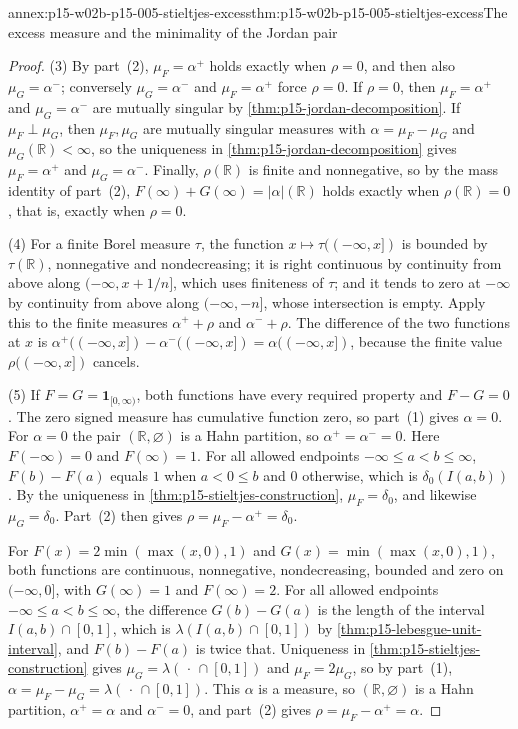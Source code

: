 \begin{annexitem}{annex:p15-w02b-p15-005-stieltjes-excess}{thm:p15-w02b-p15-005-stieltjes-excess}{The excess measure and the minimality of the Jordan pair}
\begin{proof}
(3) By part~(2), \(\mu_F=\alpha^+\) holds exactly when \(\rho=0\), and
then also \(\mu_G=\alpha^-\); conversely \(\mu_G=\alpha^-\) and
\(\mu_F=\alpha^+\) force \(\rho=0\). If \(\rho=0\), then
\(\mu_F=\alpha^+\) and \(\mu_G=\alpha^-\) are mutually singular by
\cref{thm:p15-jordan-decomposition}. If \(\mu_F\perp\mu_G\), then
\(\mu_F,\mu_G\) are mutually singular measures with
\(\alpha=\mu_F-\mu_G\) and \(\mu_G(\mathbb R)<\infty\), so the uniqueness
in \cref{thm:p15-jordan-decomposition} gives \(\mu_F=\alpha^+\) and
\(\mu_G=\alpha^-\). Finally, \(\rho(\mathbb R)\) is finite and
nonnegative, so by the mass identity of part~(2),
\(F(\infty)+G(\infty)=\lvert\alpha\rvert(\mathbb R)\) holds exactly
when \(\rho(\mathbb R)=0\), that is, exactly when \(\rho=0\).

(4) For a finite Borel measure \(\tau\), the function
\(x\mapsto\tau((-\infty,x])\) is bounded by \(\tau(\mathbb R)\),
nonnegative and nondecreasing; it is right continuous by continuity
from above along \((-\infty,x+1/n]\), which uses finiteness of \(\tau\);
and it tends to zero at \(-\infty\) by continuity from above along
\((-\infty,-n]\), whose intersection is empty. Apply this to the finite
measures \(\alpha^++\rho\) and \(\alpha^-+\rho\). The difference of the
two functions at \(x\) is
\(\alpha^+((-\infty,x])-\alpha^-((-\infty,x])=\alpha((-\infty,x])\),
because the finite value \(\rho((-\infty,x])\) cancels.

(5) If \(F=G=\mathbf1_{[0,\infty)}\), both functions have every
required property and \(F-G=0\). The zero signed measure has cumulative
function zero, so part~(1) gives \(\alpha=0\). For \(\alpha=0\) the
pair \((\mathbb R,\varnothing)\) is a Hahn partition, so
\(\alpha^+=\alpha^-=0\). Here \(F(-\infty)=0\) and \(F(\infty)=1\).
For all allowed endpoints \(-\infty\leq a<b\leq\infty\),
\(F(b)-F(a)\) equals \(1\) when \(a<0\leq b\) and \(0\) otherwise,
which is \(\delta_0(I(a,b))\). By the uniqueness in
\cref{thm:p15-stieltjes-construction}, \(\mu_F=\delta_0\), and likewise
\(\mu_G=\delta_0\). Part~(2) then gives
\(\rho=\mu_F-\alpha^+=\delta_0\).

For \(F(x)=2\min(\max(x,0),1)\) and \(G(x)=\min(\max(x,0),1)\), both
functions are continuous, nonnegative, nondecreasing, bounded and zero
on \((-\infty,0]\), with \(G(\infty)=1\) and \(F(\infty)=2\). For all
allowed endpoints \(-\infty\leq a<b\leq\infty\), the difference
\(G(b)-G(a)\) is the length of the interval \(I(a,b)\cap[0,1]\), which
is \(\lambda(I(a,b)\cap[0,1])\) by \cref{thm:p15-lebesgue-unit-interval},
and \(F(b)-F(a)\) is twice that. Uniqueness in
\cref{thm:p15-stieltjes-construction} gives
\(\mu_G=\lambda(\,\cdot\,\cap[0,1])\) and \(\mu_F=2\mu_G\), so by
part~(1), \(\alpha=\mu_F-\mu_G=\lambda(\,\cdot\,\cap[0,1])\). This
\(\alpha\) is a measure, so \((\mathbb R,\varnothing)\) is a Hahn
partition, \(\alpha^+=\alpha\) and \(\alpha^-=0\), and part~(2) gives
\(\rho=\mu_F-\alpha^+=\alpha\).


\end{proof}
\end{annexitem}
